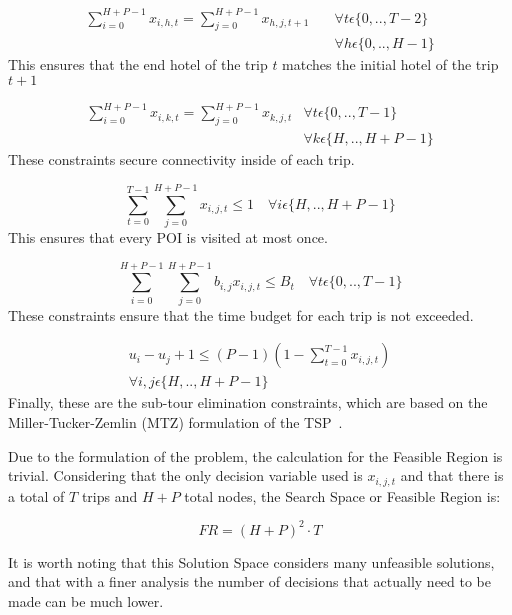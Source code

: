 \begin{eqnarray}
    \sum_{i=0}^{H+P-1} x_{i,h,t} = \sum_{j=0}^{H+P-1} x_{h,j,t+1} \quad &\forall t\epsilon \{0,..,T-2\}\nonumber\\
    &\forall h\epsilon \{0,..,H-1\}
\end{eqnarray}
This ensures that the end hotel of the trip $t$ matches the initial hotel of the trip $t+1$

\begin{eqnarray}
    \sum_{i=0}^{H+P-1} x_{i,k,t} = \sum_{j=0}^{H+P-1} x_{k,j,t} &\forall t\epsilon \{0,..,T-1\}\nonumber\\
    &\forall k\epsilon \{H,..,H+P-1\}
\end{eqnarray}
These constraints secure connectivity inside of each trip.

\begin{equation}
    \sum_{t=0}^{T-1} \sum_{j=0}^{H+P-1} x_{i,j,t} \leq 1 \quad \forall i\epsilon \{H,..,H+P-1\}
\end{equation}
This ensures that every POI is visited at most once.

\begin{equation}
    \sum_{i=0}^{H+P-1} \sum_{j=0}^{H+P-1} b_{i,j} x_{i,j,t} \leq B_t \quad \forall t\epsilon \{0,..,T-1\}
\end{equation}
These constraints ensure that the time budget for each trip is not exceeded.

\begin{eqnarray}
    u_i - u_j + 1 \leq (P-1)(1-\sum_{t=0}^{T-1} x_{i,j,t})\nonumber\\
    \forall i,j \epsilon \{H,..,H+P-1\}
\end{eqnarray}
Finally, these are the sub-tour elimination constraints, which are based on the Miller-Tucker-Zemlin (MTZ) formulation of the TSP~\cite{miller1960}.

Due to the formulation of the problem, the calculation for the Feasible Region is trivial. Considering that the only decision variable used is $x_{i,j,t}$ and that there is a total of $T$ trips and $H+P$ total nodes, the Search Space or Feasible Region is:

\begin{equation}
    FR = (H+P)^2\cdot T
\end{equation}

It is worth noting that this Solution Space considers many unfeasible solutions, and that with a finer analysis the number of decisions that actually need to be made can be much lower.

